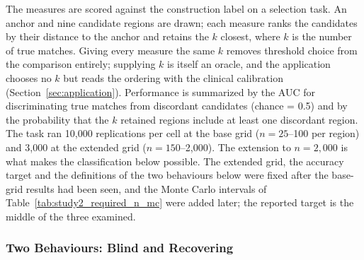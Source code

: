 \documentclass[AMA,Times1COL]{WileyNJDv5}
\begin{document}
The measures are scored against the construction label on a selection task. An anchor and nine candidate regions are drawn; each measure ranks the candidates by their distance to the anchor and retains the $k$ closest, where $k$ is the number of true matches. Giving every measure the same $k$ removes threshold choice from the comparison entirely; supplying $k$ is itself an oracle, and the application chooses no $k$ but reads the ordering with the clinical calibration (Section~\ref{sec:application}). Performance is summarized by the AUC for discriminating true matches from discordant candidates (chance = 0.5) and by the probability that the $k$ retained regions include at least one discordant region. The task ran 10{,}000 replications per cell at the base grid ($n = 25$--100 per region) and 3{,}000 at the extended grid ($n = 150$--2{,}000). The extension to $n = 2{,}000$ is what makes the classification below possible. The extended grid, the accuracy target and the definitions of the two behaviours below were fixed after the base-grid results had been seen, and the Monte Carlo intervals of Table~\ref{tab:study2_required_n_mc} were added later; the reported target is the middle of the three examined.

\subsubsection{Two Behaviours: Blind and Recovering}\label{sec:study1_classification}
\end{document}
